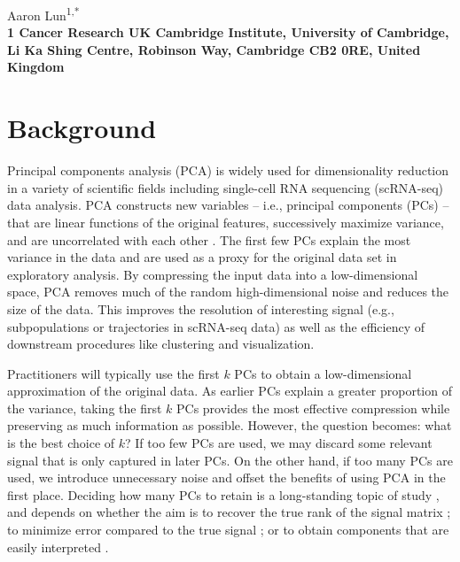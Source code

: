 \documentclass[10pt,letterpaper]{article}
\begin{document}
\vspace*{0.35in}

\begin{flushleft}
{\Large
    \textbf{}
}
\newline

Aaron Lun\textsuperscript{1,*}
\\
\bigskip
\bf{1} Cancer Research UK Cambridge Institute, University of Cambridge, Li Ka Shing Centre, Robinson Way, Cambridge CB2 0RE, United Kingdom \\
\bigskip

\end{flushleft}

\section{Background}
Principal components analysis (PCA) \cite{pearson1901lines,hotelling1933analysis} is widely used for dimensionality reduction in a variety of scientific fields including single-cell RNA sequencing (scRNA-seq) data analysis.
PCA constructs new variables -- i.e., principal components (PCs) -- that are linear functions of the original features, successively maximize variance, and are uncorrelated with each other \cite{jolliffe2016principal}.
The first few PCs explain the most variance in the data and are used as a proxy for the original data set in exploratory analysis.
By compressing the input data into a low-dimensional space, PCA removes much of the random high-dimensional noise and reduces the size of the data.
This improves the resolution of interesting signal (e.g., subpopulations or trajectories in scRNA-seq data) as well as the efficiency of downstream procedures like clustering and visualization.

Practitioners will typically use the first $k$ PCs to obtain a low-dimensional approximation of the original data.
As earlier PCs explain a greater proportion of the variance, taking the first $k$ PCs provides the most effective compression while preserving as much information as possible.
However, the question becomes: what is the best choice of $k$?
If too few PCs are used, we may discard some relevant signal that is only captured in later PCs.
On the other hand, if too many PCs are used, we introduce unnecessary noise and offset the benefits of using PCA in the first place.
Deciding how many PCs to retain is a long-standing topic of study \cite{howard1963empirical,zwick1986comparison},
and depends on whether the aim is to recover the true rank of the signal matrix \cite{zwick1986comparison};
to minimize error compared to the true signal \cite{gavish2014optimal};
or to obtain components that are easily interpreted \cite{franklin1995parallel}.
\end{document}
